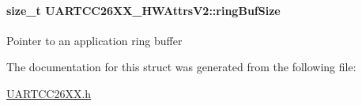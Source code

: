 \paragraph[{ring\+Buf\+Size}]{\setlength{\rightskip}{0pt plus 5cm}size\+\_\+t U\+A\+R\+T\+C\+C26\+X\+X\+\_\+\+H\+W\+Attrs\+V2\+::ring\+Buf\+Size}\label{struct_u_a_r_t_c_c26_x_x___h_w_attrs_v2_a63f6ad063feb518a1d453e550b0a4dcb}
Pointer to an application ring buffer 

The documentation for this struct was generated from the following file\+:\begin{DoxyCompactItemize}
\item 
\hyperlink{_u_a_r_t_c_c26_x_x_8h}{U\+A\+R\+T\+C\+C26\+X\+X.\+h}\end{DoxyCompactItemize}
